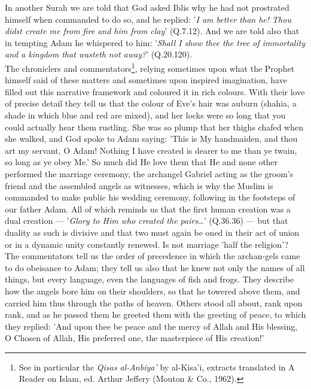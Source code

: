 \documentclass[10pt, twoside,openright]{book}
\begin{document}
In another Surah we are told that God asked Iblis why he had not prostrated himself when commanded to 
do so, and he replied: '\emph{I am better than he! Thou didst create me from fire and him from clay}' 
(Q.7.12). And we are told also that in tempting Adam he whispered to him: '\emph{Shall I show thee the tree 
of immortality and a kingdom that wasteth not away?}' (Q.20.120). \\

The chroniclers and commentators\footnote{See in particular the \emph{Qisas al\hyp{}Anbiya'} by al\hyp{}Kisa'i, extracts translated in A Reader on Islam, ed. Arthur Jeffery (Mouton \& Co., 1962).}, relying sometimes upon what the Prophet himself said of these 
matters and sometimes upon inspired imagination, have filled out this narrative framework and 
coloured it in rich colours. With their love of precise detail they tell us that the colour of Eve's 
hair was auburn (shahia, a shade in which blue and red are mixed), and her locks were so long that 
you could actually hear them rustling. She was so plump that her thighs chafed when she walked, and 
God spoke to Adam saying: 'This is My handmaiden, and thou art my servant, O Adam! Nothing I have 
created is dearer to me than ye twain, so long as ye obey Me.' So much did He love them that He and 
none other performed the marriage ceremony, the archangel Gabriel acting as the groom's friend and 
the assembled angels as witnesses, which is why the Muslim is commanded to make public his wedding 
ceremony, following in the footsteps of our father Adam. All of which reminds us that the first human 
creation was a dual creation --- '\emph{Glory to Him who created the pairs\ldots{}}' (Q.36.36) --- but that duality 
as such is divisive and that two must again be oned in their act of union or in a dynamic unity 
constantly renewed. Is not marriage 'half the religion'? \\

The commentators tell us the order of precedence in which the archan\hyp{}gels came to do obeisance to 
Adam; they tell us also that he knew not only the names of all things, but every language, even the 
languages of fish and frogs. They describe how the angels bore him on their shoulders, so that he 
towered above them, and carried him thus through the paths of heaven. Others stood all about, rank 
upon rank, and as he passed them he greeted them with the greeting of peace, to which they replied: 
'And upon thee be peace and the mercy of Allah and His blessing, O Chosen of Allah, His preferred 
one, the masterpiece of His creation!' \\
\end{document}
